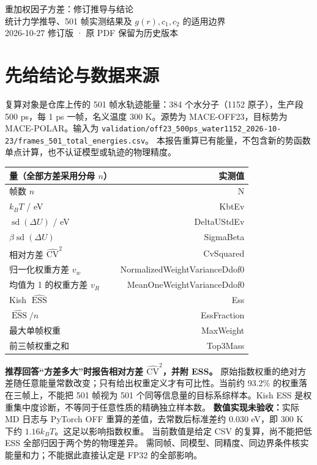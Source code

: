 \documentclass[11pt,a4paper]{article}
\newcommand{\ESS}{\operatorname{ESS}}
\begin{document}
\begin{center}{\LARGE 重加权因子方差：修订推导与结论}\\[8pt]
{\large 统计力学推导、501 帧实测结果及 $g(r),c_1,c_2$ 的适用边界}\\[6pt]
2026-10-27 修订版 · 原 PDF 保留为历史版本\end{center}
\section{先给结论与数据来源}
复算对象是仓库上传的 501 帧水轨迹能量：384 个水分子（1152 原子），生产段 500 ps，每 1 ps 一帧，名义温度 300 K。源势为 MACE-OFF23，目标势为 MACE-POLAR。输入为
\texttt{validation/off23\_500ps\_water1152\_2026-10-23/frames\_501\_total\_energies.csv}。
本报告重算已有能量，不包含新的势函数单点计算，也不认证模型或轨迹的物理精度。

\begin{center}\begin{tabular}{lr}\toprule
量（全部方差采用分母 $n$） & 实测值\\\midrule
帧数 $n$ & \csname N\endcsname\\
$k_BT$ / eV & \csname KbtEv\endcsname\\
$\operatorname{sd}(\Delta U)$ / eV & \csname DeltaUStdEv\endcsname\\
$\beta\operatorname{sd}(\Delta U)$ & \csname SigmaBeta\endcsname\\
相对方差 $\widehat{\mathrm{CV}}^2$ & \csname CvSquared\endcsname\\
归一化权重方差 $v_w$ & \csname NormalizedWeightVarianceDdof0\endcsname\\
均值为 1 的权重方差 $v_R$ & \csname MeanOneWeightVarianceDdof0\endcsname\\
Kish $\widehat{\ESS}$ & \csname Ess\endcsname\\
$\widehat{\ESS}/n$ & \csname EssFraction\endcsname\\
最大单帧权重 & \csname MaxWeight\endcsname\\
前三帧权重之和 & \csname Top3Mass\endcsname\\\bottomrule
\end{tabular}\end{center}
\textbf{推荐回答“方差多大”时报告相对方差 $\widehat{\mathrm{CV}}^2$，并附 ESS。}
原始指数权重的绝对方差随任意能量常数改变；只有给出权重定义才有可比性。当前约 93.2\% 的权重落在三帧上，不能把 501 帧视为 501 个同等信息量的目标系综样本。Kish ESS 是权重集中度诊断，不等同于任意性质的精确独立样本数。
\textbf{数值实现未验收：}实际 MD 日志与 PyTorch OFF 重算的差值，去常数后标准差约
0.030 eV，即 300 K 下约 $1.16k_BT$。这足以影响指数权重。
当前数值是给定 CSV 的复算，尚不能把低 ESS 全部归因于两个势的物理差异。
需同帧、同模型、同精度、同边界条件核实能量和力；不能据此直接认定是 FP32 的全部影响。
\newpage
\end{document}
